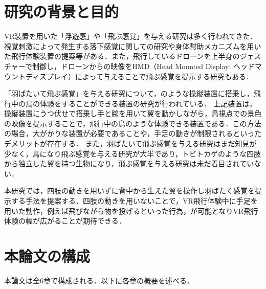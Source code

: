 \section{研究の背景と目的}

        VR装置を用いた「浮遊感」や「飛ぶ感覚」を与える研究は多く行われてきた．視覚刺激によって発生する落下感覚に関しての研究\cite{奥川夏輝2017VR空間における視覚刺激によって発生する落下感覚の分析}や身体幇助メカニズムを用いた飛行体験装置の提案\cite{鈴木拓馬2014hmd}等がある．また，飛行しているドローンを上半身のジェスチャーで制御し，ドローンからの映像をHMD（Head Mounted Display: ヘッドマウントディスプレイ）によって与えることで飛ぶ感覚を提示する研究\cite{rognon2018flyjacket}もある．


        「羽ばたいて飛ぶ感覚」を与える研究について，のような操縦装置に搭乗し，飛行中の鳥の体験をすることができる装置の研究が行われている\cite{rheiner2014birdly}\cite{hypersuit}．
        上記装置は，操縦装置にうつ伏せで搭乗し手と腕を用いて翼を動かしながら，鳥視点での景色の映像を提示することで，飛行中の鳥のような体験できる装置である．この方法の場合，大がかりな装置が必要であることや，手足の動きが制限されるといったデメリットが存在する．
        また，羽ばたいて飛ぶ感覚を与える研究はまだ知見が少なく，鳥になり飛ぶ感覚を与える研究が大半であり，トビトカゲのような四肢から独立した翼を持つ生物になり，飛ぶ感覚を与える研究は未だ着目されていない．

        本研究では，四肢の動きを用いずに背中から生えた翼を操作し羽ばたく感覚を提示する手法を提案する．四肢の動きを用いないことで，VR飛行体験中に手足を用いた動作，例えば飛びながら物を投げるといった行為，が可能となりVR飛行体験の幅が広がることが期待できる．

\section{本論文の構成}
        
        本論文は全6章で構成される．以下に各章の概要を述べる．


